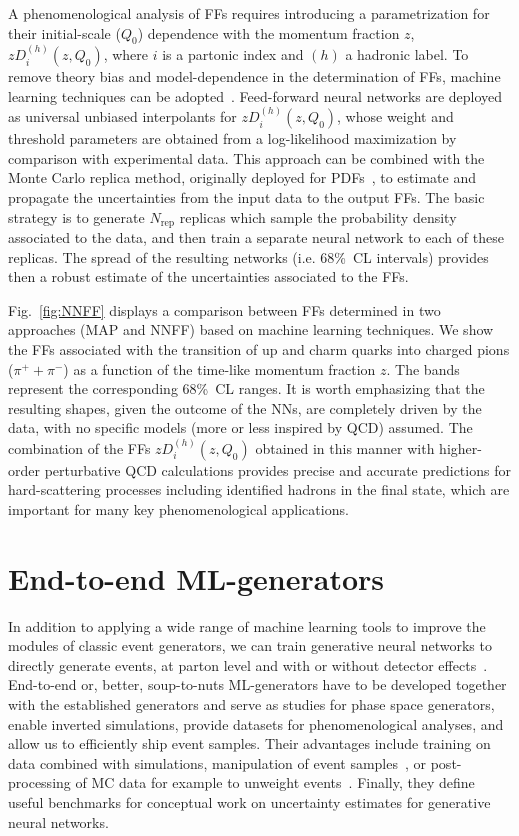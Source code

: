 \documentclass[submission,Phys]{SciPost}
\begin{document}
A phenomenological analysis of FFs requires introducing a parametrization for their initial-scale ($Q_0$) dependence with the momentum fraction $z$, $zD_i^{(h)}(z,Q_0)$, where $i$ is a partonic index and $(h)$ a hadronic label. To remove theory bias and model-dependence in  the determination of FFs, machine learning techniques can be adopted~\cite{Bertone:2017tyb,Bertone:2018ecm,Khalek:2021gxf,Soleymaninia:2022alt}. Feed-forward neural networks are deployed as universal unbiased interpolants for $zD_i^{(h)}(z,Q_0)$, whose weight and threshold parameters are obtained from a log-likelihood maximization by comparison with experimental data. This approach can be combined with the Monte Carlo replica method, originally deployed for PDFs~\cite{DelDebbio:2004xtd}, to estimate and propagate the uncertainties from the input data to the output FFs.  The basic strategy is to generate $N_\text{rep}$ replicas which sample the probability density associated to the data, and then train a separate neural network to each of these replicas. The spread of the resulting networks (i.e. 68\%~CL intervals) provides then a robust estimate of the uncertainties associated to the FFs.

Fig.~\ref{fig:NNFF} displays a comparison between FFs determined in two approaches (MAP and NNFF) based on machine learning techniques. We show the FFs associated with the transition of up and charm quarks into charged pions ($\pi^++\pi^-$) as a function of the time-like momentum fraction $z$. The bands represent the corresponding 68\%~CL ranges. It is worth emphasizing that the resulting shapes, given the outcome of the NNs, are completely driven by the data, with no specific models (more or less inspired by QCD) assumed. The combination of the FFs $zD_i^{(h)}(z,Q_0)$ obtained in this manner with higher-order perturbative QCD calculations provides precise and accurate predictions for hard-scattering processes including identified hadrons in the final state, which are important for many key phenomenological applications.

\section{End-to-end ML-generators}
\label{sec:onestage}

In addition to applying a wide range of machine learning tools to improve the modules of classic event generators, we can train generative neural networks to directly generate events, at parton level and with or without detector effects~\cite{Butter:2020tvl}. End-to-end or, better, soup-to-nuts ML-generators have to be developed together with the established generators and serve as studies for phase space generators, enable inverted simulations, provide datasets for phenomenological analyses, and allow us to efficiently ship event samples. Their advantages include training on data combined with simulations, manipulation of event samples~\cite{Butter:2019eyo}, or post-processing of MC data for example to unweight events~\cite{Verheyen:2020bjw,Backes:2020vka,Danziger:2021eeg}. Finally, they define useful benchmarks for conceptual work on uncertainty estimates for generative neural networks. 
\end{document}
